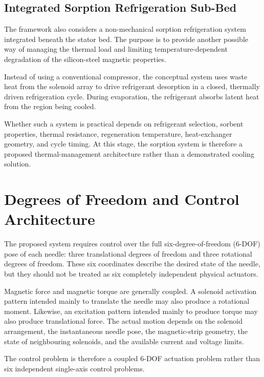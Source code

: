 \documentclass[12pt, a4paper]{article}
\begin{document}
\subsection{Integrated Sorption Refrigeration Sub-Bed}

The framework also considers a non-mechanical sorption refrigeration system integrated beneath the stator bed. The purpose is to provide another possible way of managing the thermal load and limiting temperature-dependent degradation of the silicon-steel magnetic properties.

Instead of using a conventional compressor, the conceptual system uses waste heat from the solenoid array to drive refrigerant desorption in a closed, thermally driven refrigeration cycle. During evaporation, the refrigerant absorbs latent heat from the region being cooled.

Whether such a system is practical depends on refrigerant selection, sorbent properties, thermal resistance, regeneration temperature, heat-exchanger geometry, and cycle timing. At this stage, the sorption system is therefore a proposed thermal-management architecture rather than a demonstrated cooling solution.

\section{Degrees of Freedom and Control Architecture}

The proposed system requires control over the full six-degree-of-freedom (6-DOF) pose of each needle: three translational degrees of freedom and three rotational degrees of freedom. These six coordinates describe the desired state of the needle, but they should not be treated as six completely independent physical actuators.

Magnetic force and magnetic torque are generally coupled. A solenoid activation pattern intended mainly to translate the needle may also produce a rotational moment. Likewise, an excitation pattern intended mainly to produce torque may also produce translational force. The actual motion depends on the solenoid arrangement, the instantaneous needle pose, the magnetic-strip geometry, the state of neighbouring solenoids, and the available current and voltage limits.

The control problem is therefore a coupled 6-DOF actuation problem rather than six independent single-axis control problems.
\end{document}

